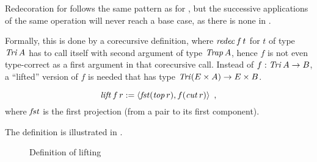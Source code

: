 Redecoration for \Tri{} follows the same pattern as for \Trif{}, but the successive applications of the same operation will never reach a base case, as there is none in \Tri{}. 


Formally, this is done by a corecursive definition, where
$\mathit{redec}\,f\,t$ for $t$ of type $\mathit{Tri}\,A$ has to call itself with
second argument of type $\mathit{Trap}\,A$, hence $f$ is not even type-correct
as a first argument in that corecursive call. Instead of $f:\mathit{Tri}\,A\to
B$, a ``lifted'' version of $f$ is needed that has type $\mathit{Tri}(E\times
A)\to E\times B$.
\begin{definition}
$$\mathit{lift}\,f\,r:=\langle \mathit{fst}(\mathit{top}\,r),f(\mathit{cut}\,r)\rangle\enspace,$$
where $\mathit{fst}$ is the first projection (from a pair to its first
component).  
\end{definition}
The definition is illustrated in .
\begin{figure}[h]
  \centering
  \vspace{-3ex}
  \caption{Definition of lifting}
  \label{fig:lift}
\end{figure}

